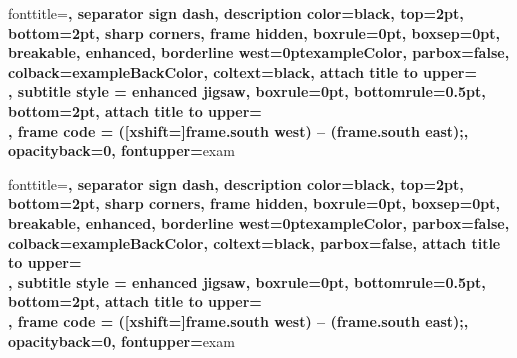     {\begin{tcbnotation*}{#1}{#2}}{\end{tcbnotation*}}
%
     {fonttitle=\sffamily\bfseries\color{exampleColor},
      separator sign dash, description color=black,
      top=2pt, bottom=2pt,
      sharp corners,
      frame hidden, boxrule=0pt, boxsep=0pt, breakable,
      enhanced, borderline west={\the\tcbBorderWidth}{0pt}{exampleColor},
      parbox=false,
      colback=exampleBackColor,
      coltext=black,
      attach title to upper={\\},
      subtitle style = {enhanced jigsaw, boxrule=0pt, bottomrule=0.5pt, bottom=2pt,
      attach title to upper={\\},
      frame code = { ([xshift=\the\tcbBorderWidth]frame.south west) -- (frame.south east);}, 
      opacityback=0, fontupper=\color{black}}}{exam}
    {\begin{tcbexample}{#1}{#2}}{\end{tcbexample}}
%
     {fonttitle=\sffamily\bfseries\color{exampleColor},
      separator sign dash, description color=black,
      top=2pt, bottom=2pt,
      sharp corners,
      frame hidden, boxrule=0pt, boxsep=0pt, breakable,
      enhanced, borderline west={\the\tcbBorderWidth}{0pt}{exampleColor},
      parbox=false,
      colback=exampleBackColor,
      coltext=black,
      parbox=false,
      attach title to upper={\\},
      subtitle style = {enhanced jigsaw, boxrule=0pt, bottomrule=0.5pt, bottom=2pt,
      attach title to upper={\\},
      frame code = { ([xshift=\the\tcbBorderWidth]frame.south west) -- (frame.south east);}, 
      opacityback=0, fontupper=\color{black}}}{exam}
    {\begin{tcbexamples}{#1}{#2}}{\end{tcbexamples}}
    {\begin{tcbexamples}{#1}{#2}\vspace*{-15pt}\begin{itemize}}{\end{itemize}\end{tcbexamples}}
